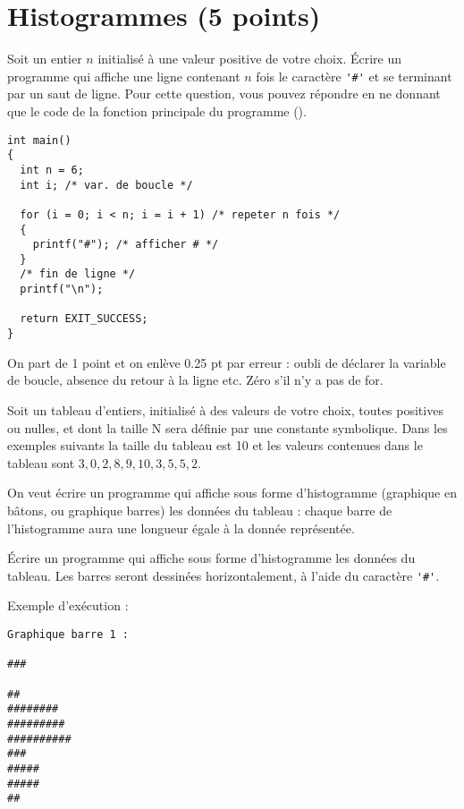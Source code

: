 \section{Histogrammes (5 points)}

\question
Soit un entier $n$ initialisé à une valeur positive de votre choix. Écrire un programme qui affiche une ligne contenant $n$ fois le caractère \verb+'#'+ et se terminant par un saut de ligne. Pour cette question, vous pouvez répondre en ne donnant que le code de la fonction principale du programme (). 

\begin{correction}
\begin{verbatim}
int main()
{
  int n = 6;
  int i; /* var. de boucle */

  for (i = 0; i < n; i = i + 1) /* repeter n fois */
  {
    printf("#"); /* afficher # */
  }
  /* fin de ligne */
  printf("\n");

  return EXIT_SUCCESS;
}
\end{verbatim}
\end{correction}

\begin{baremeenv}
  On part de 1 point et on enlève 0.25 pt par erreur : oubli de déclarer la variable de boucle, absence du retour à la ligne etc. Zéro s'il n'y a pas de for.
\end{baremeenv}

\medskip
Soit un tableau d'entiers, initialisé à des valeurs de votre choix, toutes positives ou nulles, et dont la taille N sera définie par une constante symbolique. Dans les exemples suivants la taille du tableau est 10 et les valeurs contenues dans le tableau sont $3,0,2,8,9,10,3,5,5,2$.

On veut écrire un programme qui affiche sous forme d'histogramme (graphique en bâtons, ou graphique barres) les données du tableau : chaque barre de l'histogramme aura une longueur égale à la donnée représentée.

\question
Écrire un programme qui affiche sous forme d'histogramme les données du tableau. Les barres seront dessinées horizontalement, à l'aide du caractère \verb+'#'+. 

Exemple d'exécution :
\begin{small}
\begin{verbatim}
Graphique barre 1 :

###

##
########
#########
##########
###
#####
#####
##
\end{verbatim}
\end{small}


